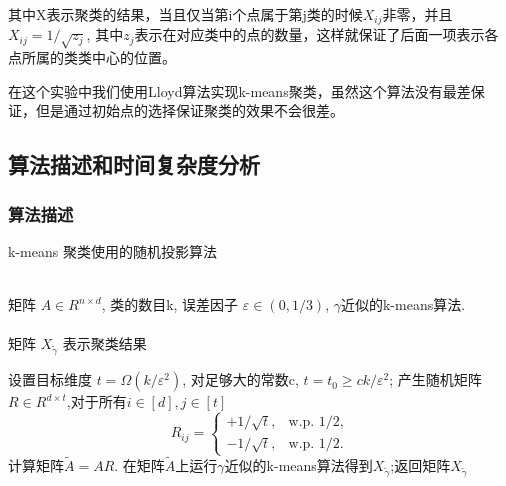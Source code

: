 \documentclass{ctexart}
\begin{document}
        其中X表示聚类的结果，当且仅当第i个点属于第j类的时候$X_{ij}$非零，并且$X_{ij}= 1/\sqrt{z_{j}}$, 其中$z_{j}$表示在对应类中的点的数量，这样就保证了后面一项表示各点所属的类类中心的位置。

        在这个实验中我们使用Lloyd算法实现k-means聚类，虽然这个算法没有最差保证，但是通过初始点的选择保证聚类的效果不会很差。

    \subsection{算法描述和时间复杂度分析}
    \subsubsection{算法描述}
    \renewcommand{\algorithmicrequire}{ \textbf{Input:}} %
    \renewcommand{\algorithmicensure}{ \textbf{Output:}} %
    \begin{algorithm}[htb]
    \caption{k-means 聚类使用的随机投影算法}
    \label{RP}
        \begin{algorithmic}[1] %
        \REQUIRE ~~\\ %
            矩阵 $ A \in R^{n \times d}$, 类的数目k, 误差因子 $\varepsilon \in (0, 1/3)$, $\gamma$近似的k-means算法. \\
        \ENSURE ~~\\ %
            矩阵 $ X_{\tilde{\gamma}} $ 表示聚类结果

        \STATE 设置目标维度 $ t = \Omega(k/\varepsilon^2)$, 对足够大的常数c, $t = t_{0} \ge ck/\varepsilon^2 $;
        \label{ step 1 }%
        \STATE 产生随机矩阵 $ R \in R^{d \times t} $,对于所有$ i \in [d], j \in [t]$
        \begin{equation*}
        R_{ij} = \begin{cases} +1/\sqrt{t},& \mbox{w.p. 1/2,} \\ -1/\sqrt{t}, & \mbox{w.p. 1/2.}\end{cases}
        \end{equation*}
        \label{step 2}
        \STATE 计算矩阵$\tilde{A} = AR$.
        \label{step 3}
        \STATE 在矩阵$ \tilde{A}$上运行$\gamma$近似的k-means算法得到$X_{\tilde{\gamma}}$;返回矩阵$ X_{\tilde{\gamma}}$
        \label{step 4}
        \end{algorithmic}
    \end{algorithm}
\end{document}
